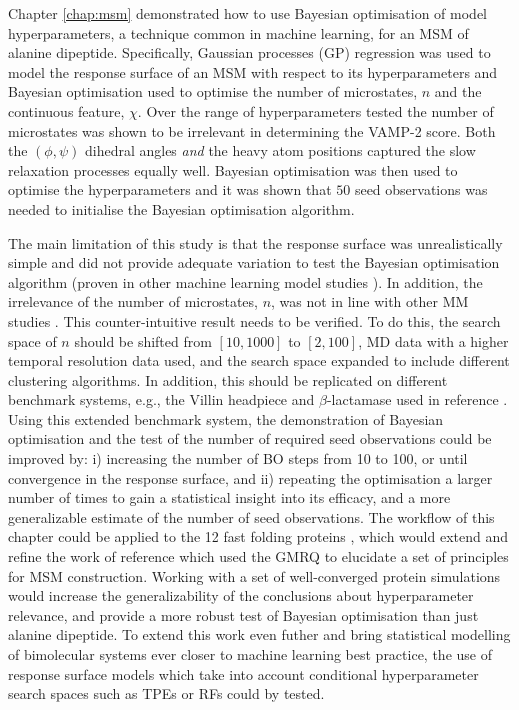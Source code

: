 Chapter \ref{chap:msm} demonstrated how to use Bayesian optimisation of model hyperparameters, a technique common in machine learning, for an MSM of alanine dipeptide. Specifically, Gaussian processes (GP) regression was used to model the response surface of an MSM with respect to its hyperparameters and Bayesian optimisation used to optimise the number of microstates, $n$ and the continuous feature, $\chi$. Over the range of hyperparameters tested the number of microstates was shown to be irrelevant in determining the VAMP-2 score. Both the $(\phi, \psi)$ dihedral angles \emph{and} the heavy atom positions captured the slow relaxation processes equally well. Bayesian optimisation was then used to optimise the hyperparameters and it was shown that $50$ seed observations was needed to initialise the Bayesian optimisation algorithm. 

The main limitation of this study is that the response surface was unrealistically simple and did not provide adequate variation to test the Bayesian optimisation algorithm (proven in other machine learning model studies \cite{bergstraAlgorithmsHyperParameterOptimizationa,bergstrajamesbergstraRandomSearchHyperParameter2012}).  In addition, the irrelevance of the number of microstates, $n$, was not in line with other MM studies \cite{mcgibbonStatisticalModelSelection2014a,wuVariationalApproachLearning2020c,mcgibbonVariationalCrossvalidationSlow2015}. This counter-intuitive result needs to be verified. To do this, the search space of $n$ should be shifted from $[10, 1000]$ to $[2, 100]$, MD data with a higher temporal resolution data used, and the search space expanded to include different clustering algorithms.  In addition, this should be replicated on different benchmark systems, e.g., the Villin headpiece and $\beta$-lactamase used in reference \cite{bowmanQuantitativeComparisonAlternative2013}. Using this extended benchmark system, the demonstration of Bayesian optimisation and the test of the number of required seed observations could be improved by: i) increasing the number of BO steps from \num{10} to \num{100}, or until convergence in the response surface, and ii) repeating the optimisation a larger number of times to gain a statistical insight into its efficacy, and a more generalizable estimate of the number of seed observations. The workflow of this chapter could be applied to the 12 fast folding proteins \cite{lindorff-larsenHowFastFoldingProteins2011a}, which would extend and refine the work of reference \cite{husicOptimizedParameterSelection2016} which used the GMRQ to elucidate a set of principles for MSM construction. Working with a set of well-converged protein simulations would increase the generalizability of the conclusions about hyperparameter relevance, and provide a more robust test of Bayesian optimisation than just alanine dipeptide.  To extend this work even futher and bring statistical modelling of bimolecular systems ever closer to machine learning best practice, the use of response surface models which take into account conditional hyperparameter search spaces such as TPEs or RFs could by tested.

